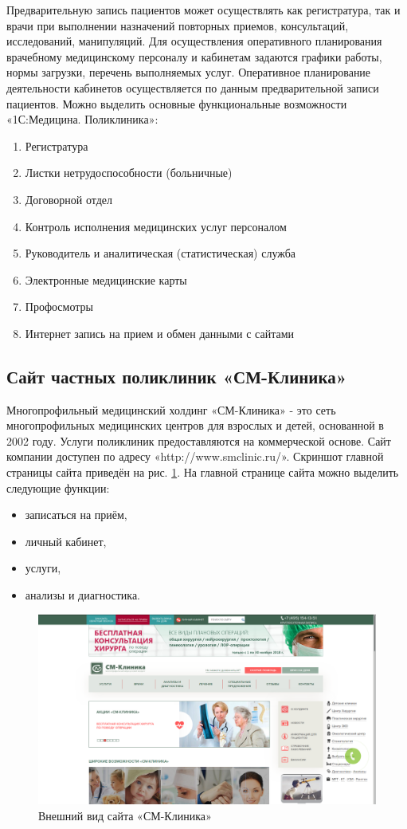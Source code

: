 \documentclass[14pt,a4paper,russian]{extreport}
\begin{document}
Предварительную запись пациентов может осуществлять как регистратура, так и врачи при выполнении
назначений повторных приемов, консультаций, исследований, манипуляций. Для осуществления
оперативного планирования врачебному медицинскому персоналу и кабинетам задаются графики работы,
нормы загрузки, перечень выполняемых услуг. Оперативное планирование деятельности кабинетов
осуществляется по данным предварительной записи пациентов.\cite{1cclinic}
Можно выделить основные функциональные возможности «1С:Медицина. Поликлиника»:
\begin{enumerate}[noitemsep]
    \item Регистратура
    \item Листки нетрудоспособности (больничные)
    \item Договорной отдел
    \item Контроль исполнения медицинских услуг персоналом
    \item Руководитель и аналитическая (статистическая) служба
    \item Электронные медицинские карты
    \item Профосмотры
    \item Интернет запись на прием и обмен данными с сайтами
\end{enumerate}

\subsection{Сайт частных поликлиник «СМ-Клиника»}
Многопрофильный медицинский холдинг «СМ-Клиника»  - это сеть многопрофильных
медицинских центров для взрослых и детей, основанной в 2002 году. Услуги поликлиник предоставляются
на коммерческой основе.
Сайт компании доступен по адресу «http://www.smclinic.ru/».
Скриншот главной страницы сайта приведён на рис. \ref{fig:cc}.
На главной странице сайта можно выделить следующие функции:
\begin{itemize}[noitemsep]
    \item записаться на приём,
    \item личный кабинет, 
    \item услуги,
    \item анализы и диагностика.
\end{itemize}


\begin{figure}[t!]
        \includegraphics[width=\textwidth]{cmclinic}
        \caption{Внешний вид сайта «СМ-Клиника»}
        \label{fig:cc}
\end{figure}
\end{document}
